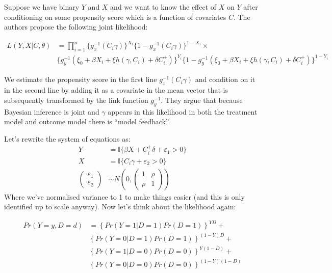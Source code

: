 \documentclass{article}
\begin{document}
   
Suppose we have binary $Y$ and $X$ and we want to know the effect of $X$ on $Y$ 
after conditioning on some propensity score which is a function of covariates 
$C$. The authors propose the following joint likelihood:

\begin{align*}
    L(Y, X | C, \theta) &= \prod^n_{i = 1} \{
        g_x^{-1}(C_i \gamma)\}^{X_i} \{
            1 - g_x^{-1}(C_i\gamma)\}^{1 - X_i} \times \\
            &\{
                g_y^{-1}(\xi_0 + \beta X_i + \xi h(\gamma, C_i) + \delta C^+_i)
                \}^{Y_i} 
                \{1 -
                g_y^{-1}(\xi_0 + \beta X_i + \xi h(\gamma, C_i) + \delta C^+_i)
                \}^{1 - Y_i} 
\end{align*}

We estimate the propensity score in the first line $g_x^{-1}(C_i\gamma)$ and 
condition on it in the second line by adding it as a covariate in the mean vector 
that is subsequently transformed by the link function $g_y^{-1}$.
They argue that because Bayesian inference is joint and $\gamma$ appears in this likelihood in both the treatment 
model and outcome model there is ``model feedback''.


Let's rewrite the system of equations as:
\begin{align*}
    Y &= \mathbb{I}\{\beta X +  C_i^+ \delta + \varepsilon_1 > 0\} \\
    X &= \mathbb{I}\{ C_i\gamma + \varepsilon_2 > 0 \} \\
    \begin{pmatrix}
        \varepsilon_1 \\
        \varepsilon_2
    \end{pmatrix} &\sim N\left(0, \begin{pmatrix}
        1 & \rho \\
        \rho & 1
    \end{pmatrix}\right)
\end{align*}
Where we've normalised variance to 1 to make things easier (and this is only 
identified up to scale anyway). Now let's think about the likelihood again:

\begin{align*}
    Pr(Y = y, D = d) &= \left\{
        Pr(Y = 1 | D = 1) Pr(D = 1)
    \right\}^{YD} + \\
&\left\{
        Pr(Y = 0 | D = 1) Pr(D = 1)
    \right\}^{(1 -Y)D} + \\
&\left\{
        Pr(Y = 1 | D = 0) Pr(D = 0)
    \right\}^{Y(1 - D)} + \\
&\left\{
        Pr(Y = 0 | D = 0) Pr(D = 0)
    \right\}^{(1 -Y)(1 - D)} 
\end{align*}
\end{document}
